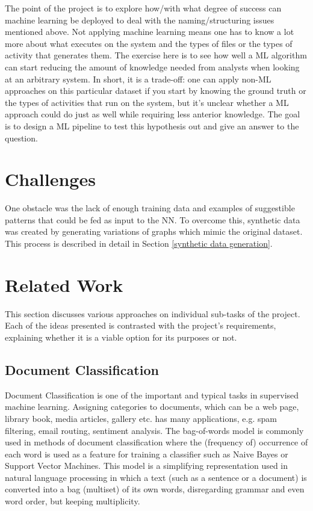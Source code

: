 The point of the project is to explore how/with what degree of success can machine learning be deployed to deal with the naming/structuring issues mentioned above. Not applying machine learning means one has to know a lot more about what executes on the system and the types of files or the types of activity that generates them. The exercise here is to see how well a ML algorithm can start reducing the amount of knowledge needed from analysts when looking at an arbitrary system. In short, it is a trade-off: one can apply non-ML approaches on this particular dataset if you start by knowing the ground truth or the types of activities that run on the system, but it's unclear whether a ML approach could do just as well while requiring less anterior knowledge. The goal is to design a ML pipeline to test this hypothesis out and give an answer to the question. \\

\section{Challenges}

One obstacle was the lack of enough training data and examples of suggestible patterns that could be fed as input to the NN. To overcome this, synthetic data was created by generating variations of graphs which mimic the original dataset. This process is described in detail in Section \ref{synthetic data generation}.

\section{Related Work}

This section discusses various approaches on individual sub-tasks of the project. Each of the ideas presented is contrasted with the project's requirements, explaining whether it is a viable option for its purposes or not. \\

\subsection{Document Classification}

Document Classification is one of the important and typical tasks in supervised machine learning. Assigning categories to documents, which can be a web page, library book, media articles, gallery etc. has many applications, e.g. spam filtering, email routing, sentiment analysis. The bag-of-words model is commonly used in methods of document classification where the (frequency of) occurrence of each word is used as a feature for training a classifier such as Naive Bayes or Support Vector Machines. This model is a simplifying representation used in natural language processing in which a text (such as a sentence or a document) is converted into a bag (multiset) of its own words, disregarding grammar and even word order, but keeping multiplicity. \\


